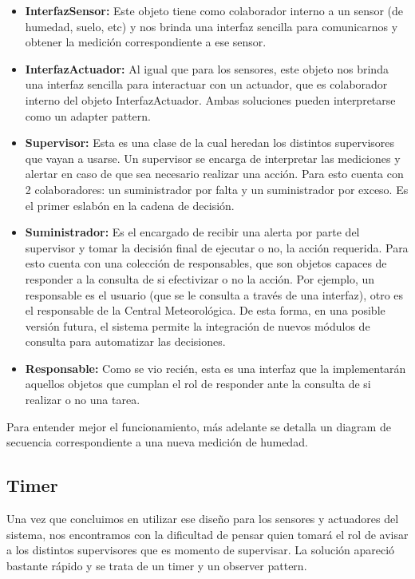 \begin{itemize}
\item \textbf{InterfazSensor:} Este objeto tiene como colaborador interno a un sensor (de humedad, suelo, etc) y nos brinda una interfaz sencilla para comunicarnos y obtener la medición correspondiente a ese sensor.

\item \textbf{InterfazActuador:} Al igual que para los sensores, este objeto nos brinda una interfaz sencilla para interactuar con un actuador, que es colaborador interno del objeto InterfazActuador. Ambas soluciones pueden interpretarse como un adapter pattern.

\item \textbf{Supervisor:} Esta es una clase de la cual heredan los distintos supervisores que vayan a usarse. Un supervisor se encarga de interpretar las mediciones y alertar en caso de que sea necesario realizar una acción. Para esto cuenta con 2 colaboradores: un suministrador por falta y un suministrador por exceso. Es el primer eslabón en la cadena de decisión.

\item \textbf{Suministrador:} Es el encargado de recibir una alerta por parte del supervisor y tomar la decisión final de ejecutar o no, la acción requerida. Para esto cuenta con una colección de responsables, que son objetos capaces de responder a la consulta de si efectivizar o no la acción. Por ejemplo, un responsable es el usuario (que se le consulta a través de una interfaz), otro es el responsable de la Central Meteorológica. De esta forma, en una posible versión futura, el sistema permite la integración de nuevos módulos de consulta para automatizar las decisiones.

\item \textbf{Responsable:} Como se vio recién, esta es una interfaz que la implementarán aquellos objetos que cumplan el rol de responder ante la consulta de si realizar o no una tarea. 
\end{itemize}
Para entender mejor el funcionamiento, más adelante se detalla un diagram de secuencia correspondiente a una nueva medición de humedad.


\subsection{Timer}
Una vez que concluimos en utilizar ese diseño para los sensores y actuadores del sistema, nos encontramos con la dificultad de pensar quien tomará el rol de avisar a los distintos supervisores que es momento de supervisar. La solución apareció bastante rápido y se trata de un timer y un observer pattern.

